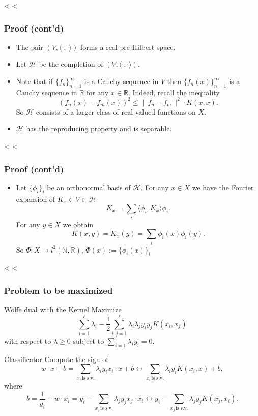 \documentclass{beamer}
\begin{document}
<%
<%
\begin{frame}[t]\frametitle{Proof (cont'd)}
	\begin{itemize}
		\item The pair $(V,\langle\cdot,\cdot\rangle)$ forms a real pre-Hilbert space.
		\pause
		\vfill
		\item Let $\mathscr{H}$ be the completion of $(V,\langle\cdot,\cdot\rangle)$.
		\pause
		\vfill
		\item Note that if $\{f_n\}_{n=1}^\infty$ is a Cauchy sequence in $V$ then $\{f_n(x)\}_{n=1}^\infty$ is a Cauchy sequence in $\mathbb{R}$ for any $x\in\mathbb{R}$. Indeed, recall the inequality
		\[
			(f_n(x) - f_m(x))^2 \leq \|f_n - f_m\|^2 \cdot K(x,x).
		\]
		So $\mathscr{H}$ consists of a larger class of real valued functions on $X$.
		\pause
		\vfill
		\item $\mathscr{H}$ has the reproducing property and is separable.
	\end{itemize}
\end{frame}

<%
<%
\begin{frame}[c]\frametitle{Proof (cont'd)}
	\begin{itemize}
		\item Let $\{\phi_i\}_{i}$ be an orthonormal basis of $\mathscr{H}$. For any $x\in X$ we have the Fourier expansion of $K_x \in V \subset \mathscr{H}$
		\[
			K_x = \sum_{i} \langle \phi_i, K_x \rangle \phi_i.
		\]
		For any $y \in X$ we obtain
		\[
			K(x,y) = K_x(y) = \sum_{i} \phi_i(x) \phi_i(y).
		\]
		So $\Phi: X \to l^2(\mathbb{N},\mathbb{R})$, $\Phi(x) := \{\phi_i(x)\}_i$ \hfill\qedsymbol
	\end{itemize}
\end{frame}

<%
<%
\begin{frame}[t]\frametitle{Problem to be maximized}  
	\begin{block}{Wolfe dual with the Kernel}
		Maximize
		\[
			\sum_{i=1}^\ell \lambda_i -\frac{1}{2} \sum_{i,j=1}^\ell \lambda_i \lambda_j y_i y_j K(x_i,x_j)
		\]
		with respect to $\lambda \geq 0$ subject to $\sum_{i=1}^\ell \lambda_i y_i = 0$.
	\end{block}
	\begin{block}{Classificator}
		Compute the sign of
		\[
			w\cdot x + b = \sum_{x_i \, \text{is s.v.}} \lambda_i y_i x_i \cdot x + b \leftrightarrow \sum_{x_i \, \text{is s.v.}} \lambda_i y_i K(x_i,x) + b,
		\]
		where
		\[
			b = \frac{1}{y_i} - w \cdot x_i = y_i - \sum_{x_j \, \text{is s.v.}} \lambda_j y_j x_j \cdot x_i \leftrightarrow y_i - \sum_{x_j \, \text{is s.v.}} \lambda_j y_j K(x_j,x_i).
		\]
	\end{block}
\end{frame}
\end{document}

